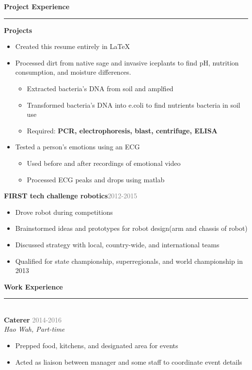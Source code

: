 \documentclass[a4paper,sans]{moderncv}
\begin{document}
\begin{parcolumns}[colwidths={1=0.7\textwidth, 2=0.22\textwidth}]{2}
{ 	\textbf{\LARGE{Project Experience}} \\
 	\noindent\color{gray}\rule{13cm}{0.5mm}
 	\color{black}\Large


 	\noindent\Large
 		 \noindent\textbf{Projects}
 		\begin{itemize}
 			\item  Created this resume entirely in LaTeX
			\item Processed dirt from native sage and invasive iceplants to find pH, nutrition consumption, and moisture differences.
			\begin{itemize}
				\item Extracted bacteria's DNA from soil and amplfied
				\item Transformed bacteria's DNA into e.coli to find nutrients bacteria in soil use
				\item Required: \textbf{PCR, electrophoresis, blast, centrifuge, ELISA}
			\end{itemize}
			\item Tested a person's emotions using an ECG
			\begin{itemize}
				\item Used before and after recordings of emotional video
				\item Processed ECG peaks and drops using matlab
			\end{itemize}
 		\end{itemize}
	\textbf{FIRST tech challenge robotics}\null\hspace{5.5cm}\textcolor{gray}{2012-2015}
 	\begin{itemize}
 		\item Drove robot during competitions
 		\item Brainstormed ideas and prototypes for robot design(arm and chassis of robot)
 		\item Discussed strategy with local, country-wide, and international teams
		\item Qualified for state championship, superregionals, and world championship in 2013
 	\end{itemize}
		\null

		 	\textbf{\LARGE{Work Experience}} \\
		 	\noindent\color{gray}\rule{13cm}{0.5mm} \\
		 	\color{black}\Large
		 	\textbf{Caterer}
		 	\null\hspace{9.5cm}\textcolor{gray}{2014-2016} \\
		 	\textit{Hao Wah, Part-time}
		 	\begin{itemize}
		 		\item Prepped food, kitchens, and designated area for events
		 		\item Acted as liaison between manager and some staff to coordinate event details
		 	\end{itemize}

}
\end{parcolumns}
\end{document}
